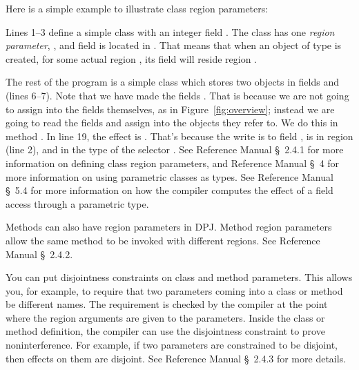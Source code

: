 Here is a simple example to illustrate class region parameters:
%

%
Lines 1--3 define a simple  class with an integer field
.  The class has one \emph{region parameter}, , and
field  is located in .  That means that when an object
of type  is created, for some actual region , its
 field will reside region .

The rest of the program is a simple class  which stores
two  objects in fields  and  (lines
6--7).  Note that we have made the fields .  That is
because we are not going to assign into the fields themselves, as in
Figure~\ref{fig:overview}; instead we are going to read the fields and
assign into the objects they refer to.  We do this in method
.  In line 19, the effect is .
That's because the write is to field ,  is in region
 (line 2), and  in the type of the selector
.  See Reference Manual \S~2.4.1 for more information on
defining class region parameters, and Reference Manual \S~4 for more
information on using parametric classes as types.  See Reference
Manual \S~5.4 for more information on how the compiler computes the
effect of a field access through a parametric type.

 Methods can also have region
parameters in DPJ.  Method region parameters allow the same method to
be invoked with different regions.  See Reference Manual \S~2.4.2.

 You can put
disjointness constraints on class and method parameters.  This allows
you, for example, to require that two parameters coming into a class
or method be different names.  The requirement is checked by the
compiler at the point where the region arguments are given to the
parameters.  Inside the class or method definition, the compiler can
use the disjointness constraint to prove noninterference.  For
example, if two parameters are constrained to be disjoint, then
effects on them are disjoint.  See Reference Manual \S~2.4.3 for
more details.

